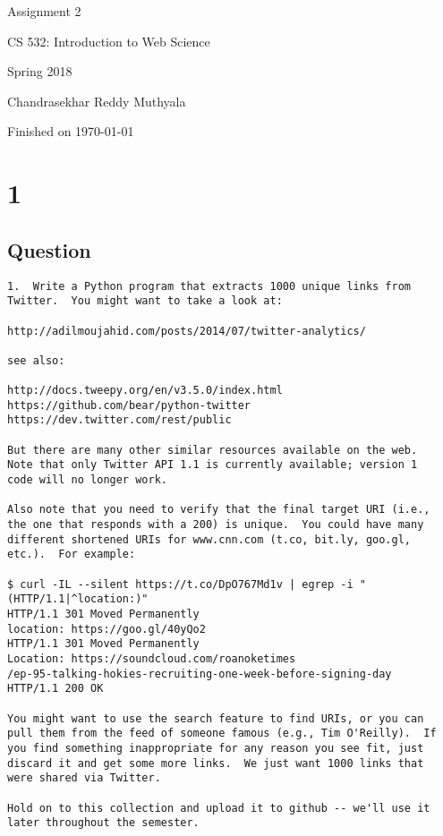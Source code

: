 \documentclass[letterpaper,11pt]{article}
\begin{document}
\begin{titlepage}

\begin{center}

\Huge{Assignment 2}

\Large{CS 532:  Introduction to Web Science}

\Large{Spring 2018}

\Large{Chandrasekhar Reddy Muthyala}

\Large Finished on \today

\end{center}

\end{titlepage}

\newpage


\section*{1}


\subsection*{Question}

\begin{verbatim}
1.  Write a Python program that extracts 1000 unique links from
Twitter.  You might want to take a look at:

http://adilmoujahid.com/posts/2014/07/twitter-analytics/

see also:

http://docs.tweepy.org/en/v3.5.0/index.html
https://github.com/bear/python-twitter
https://dev.twitter.com/rest/public

But there are many other similar resources available on the web.
Note that only Twitter API 1.1 is currently available; version 1
code will no longer work.

Also note that you need to verify that the final target URI (i.e.,
the one that responds with a 200) is unique.  You could have many
different shortened URIs for www.cnn.com (t.co, bit.ly, goo.gl,
etc.).  For example:

$ curl -IL --silent https://t.co/DpO767Md1v | egrep -i "(HTTP/1.1|^location:)"
HTTP/1.1 301 Moved Permanently
location: https://goo.gl/40yQo2
HTTP/1.1 301 Moved Permanently
Location: https://soundcloud.com/roanoketimes
/ep-95-talking-hokies-recruiting-one-week-before-signing-day
HTTP/1.1 200 OK

You might want to use the search feature to find URIs, or you can
pull them from the feed of someone famous (e.g., Tim O'Reilly).  If
you find something inappropriate for any reason you see fit, just
discard it and get some more links.  We just want 1000 links that
were shared via Twitter.

Hold on to this collection and upload it to github -- we'll use it
later throughout the semester.
\end{verbatim}
\end{document}
